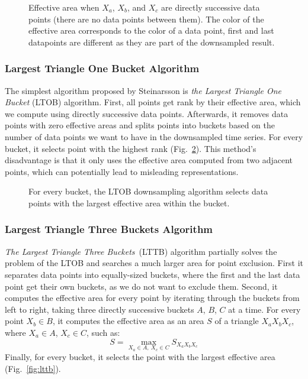 \begin{figure}[h]
    \centering
    
    \caption{Effective area when $X_a$, $X_b$, and $X_c$ are directly successive data points (there are no data points between them). The color of the effective area corresponds to the color of a data point, first and last datapoints are different as they are part of the downsampled result.}
    \label{fig:effective-area}
\end{figure}

\subsubsection{Largest Triangle One Bucket Algorithm}
The simplest algorithm proposed by Steinarsson is \textit{the Largest Triangle One Bucket} (LTOB) algorithm. First, all points get rank by their effective area, which we compute using directly successive data points. Afterwards, it removes data points with zero effective areas and splits points into buckets based on the number of data points we want to have in the downsampled time series. For every bucket, it selects point with the highest rank (Fig.~\ref{fig:ltob}). This method's disadvantage is that it only uses the effective area computed from two adjacent points, which can potentially lead to misleading representations.

\begin{figure}[h]
    \centering
    
    \caption{For every bucket, the LTOB downsampling algorithm selects data points with the largest effective area within the bucket.}
    \label{fig:ltob}
\end{figure}

\subsubsection{Largest Triangle Three Buckets Algorithm}
\textit{The Largest Triangle Three Buckets}~(LTTB) algorithm partially solves the problem of the LTOB and searches a much larger area for point exclusion. First it separates data points into equally-sized buckets, where the first and the last data point get their own buckets, as we do not want to exclude them. Second, it computes the effective area for every point by iterating through the buckets from left to right, taking three directly successive buckets $A$, $B$, $C$ at a time. For every point $X_b \in B$, it computes the effective area as an area $S$ of a triangle $X_a X_b X_c$, where $X_a \in A$, $X_c \in C$, such as:
\begin{equation}
    S = \max_{X_a \in A,~X_c \in C} S_{X_a X_b X_c}
\end{equation}
Finally, for every bucket, it selects the point with the largest effective area (Fig.~\ref{fig:lttb}).

